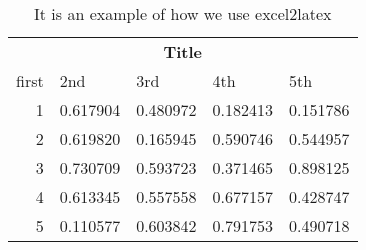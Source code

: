 \documentclass{book}
\begin{document}
	
\begin{table}[htbp]
	\centering
	\caption{ It is an example of how we use excel2latex}
	\begin{tabular}{|rrrrr|}
		\toprule
		\multicolumn{5}{|c|}{\multirow{2}[2]{*}{\textbf{Title}}} \\
		\multicolumn{5}{|c|}{} \\
		\midrule
		\multicolumn{1}{|l}{first } & \multicolumn{1}{l}{2nd } & \multicolumn{1}{l}{3rd} & \multicolumn{1}{l}{4th } & \multicolumn{1}{l|}{5th} \\
		\midrule
		1     & 0.617904 & 0.480972 & 0.182413 & 0.151786 \\
		\midrule
		\midrule
		2     & 0.619820 & 0.165945 & 0.590746 & 0.544957 \\
		3     & 0.730709 & 0.593723 & 0.371465 & 0.898125 \\
		4     & 0.613345 & 0.557558 & 0.677157 & 0.428747 \\
		5     & 0.110577 & 0.603842 & 0.791753 & 0.490718 \\
		\bottomrule
	\end{tabular}%
	\label{tab:addlabel}%
\end{table}%
\end{document}

